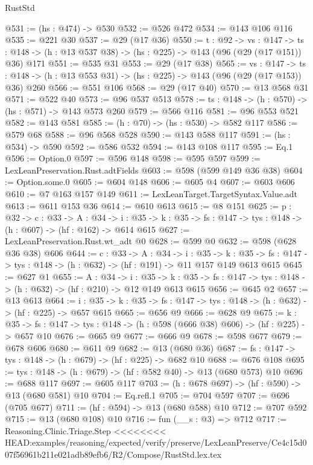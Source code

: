 \begin{lexlean}{RustStd}
\begin{coremodule}
{\begin{coremodule}
{{{{{@531 := (hs : @474) -> @530
@532 := @526 @472
@534 := @143 @106 @116
@535 := @221 @30
@537 := @29 (@17 @36)
@550 := {t : @92} ->
  {vs : @147} ->
  {ts : @148} -> (h : @13 @537 @38) -> (hs : @225) -> @143 (@96 (@29 (@17 @151)) @36) @171
@551 := @535 @31
@553 := @29 (@17 @38)
@565 := {vs : @147} ->
  {ts : @148} -> (h : @13 @553 @31) -> (hs : @225) -> @143 (@96 (@29 (@17 @153)) @36) @260
@566 := @551 @106
@568 := @29 (@17 @40)
@570 := @13 @568 @31
@571 := @522 @40
@573 := @96 @537 @513
@578 := {ts : @148} -> (h : @570) -> (hs : @571) -> @143 @573 @260
@579 := @566 @116
@581 := @96 @553 @521
@582 := @143 @581
@585 := (h : @70) -> (hs : @530) -> @582 @117
@586 := @579 @68
@588 := @96 @568 @528
@590 := @143 @588 @117
@591 := (hs : @534) -> @590
@592 := @586 @532
@594 := @143 @108 @117
@595 := Eq.{1}
@596 := Option.{0}
@597 := @596 @148
@598 := @595 @597
@599 := LexLeanPreservation.Rust.adtFields
@603 := @598 (@599 @149 @36 @38)
@604 := Option.some.{0}
@605 := @604 @148
@606 := @605 @4
@607 := @603 @606
@610 := @7 @163 @157 @149
@611 := LexLeanTarget.TargetSyntax.Value.adt
@613 := @611 @153 @36
@614 := @610 @613
@615 := @8 @151
@625 := {p : @32} ->
  {c : @33} ->
  {A : @34} ->
  {i : @35} -> {k : @35} -> {fs : @147} -> {tys : @148} -> (h : @607) -> (hf : @162) -> @614 @615
@627 := LexLeanPreservation.Rust.wt_adt @0
@628 := @599 @0
@632 := @598 (@628 @36 @38) @606
@644 := {c : @33} ->
  {A : @34} ->
  {i : @35} ->
  {k : @35} -> {fs : @147} -> {tys : @148} -> (h : @632) -> (hf : @191) -> @11 @157 @149 @613 @615
@645 := @627 @1
@655 := {A : @34} ->
  {i : @35} ->
  {k : @35} -> {fs : @147} -> {tys : @148} -> (h : @632) -> (hf : @210) -> @12 @149 @613 @615
@656 := @645 @2
@657 := @13 @613
@664 := {i : @35} ->
  {k : @35} -> {fs : @147} -> {tys : @148} -> (h : @632) -> (hf : @225) -> @657 @615
@665 := @656 @9
@666 := @628 @9
@675 := {k : @35} ->
  {fs : @147} -> {tys : @148} -> (h : @598 (@666 @38) @606) -> (hf : @225) -> @657 @10
@676 := @665 @9
@677 := @666 @9
@678 := @598 @677
@679 := @678 @606
@680 := @611 @9
@682 := @13 (@680 @36)
@687 := {fs : @147} -> {tys : @148} -> (h : @679) -> (hf : @225) -> @682 @10
@688 := @676 @108
@695 := {tys : @148} -> (h : @679) -> (hf : @582 @40) -> @13 (@680 @573) @10
@696 := @688 @117
@697 := @605 @117
@703 := (h : @678 @697) -> (hf : @590) -> @13 (@680 @581) @10
@704 := Eq.refl.{1}
@705 := @704 @597
@707 := @696 (@705 @677)
@711 := (hf : @594) -> @13 (@680 @588) @10
@712 := @707 @592
@715 := @13 (@680 @108) @10
@716 := fun (__s : @3) => @712
@717 := Reasoning.Clinic.Triage.Step
<<<<<<<< HEAD:examples/reasoning/expected/verify/preserve/LexLeanPreserve/Ce4c15d007f56961b211e021adb89efb6/R2/Compose/RustStd.lex.tex
}}}}}
\end{coremodule}}
\end{coremodule}
\end{lexlean}
